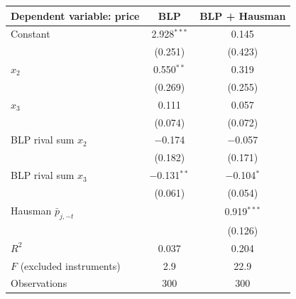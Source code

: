 \begin{tabular}{lcc}
\toprule
Dependent variable: price & BLP & BLP + Hausman \\
\midrule
Constant & 2.928$^{***}$ & 0.145 \\
 & (0.251) & (0.423) \\
$x_2$ & 0.550$^{**}$ & 0.319 \\
 & (0.269) & (0.255) \\
$x_3$ & 0.111 & 0.057 \\
 & (0.074) & (0.072) \\
BLP rival sum $x_2$ & $-$0.174 & $-$0.057 \\
 & (0.182) & (0.171) \\
BLP rival sum $x_3$ & $-$0.131$^{**}$ & $-$0.104$^{*}$ \\
 & (0.061) & (0.054) \\
Hausman $\bar p_{j,-t}$ &  & 0.919$^{***}$ \\
 &  & (0.126) \\
\midrule
$R^2$ & 0.037 & 0.204 \\
$F$ (excluded instruments) & 2.9 & 22.9 \\
Observations & 300 & 300 \\
\bottomrule
\end{tabular}

